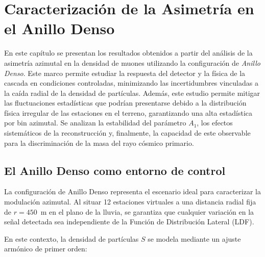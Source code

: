 %

\section{Caracterización de la Asimetría en el Anillo Denso}
\label{sec:cap_anillo_denso}

En este capítulo se presentan los resultados obtenidos a partir del análisis de la asimetría azimutal en la densidad de muones utilizando la configuración de \textit{Anillo Denso}. Este marco permite estudiar la respuesta del detector y la física de la cascada en condiciones controladas, minimizando las incertidumbres vinculadas a la caída radial de la densidad de partículas. Además, este estudio permite mitigar las fluctuaciones estadísticas que podrían presentarse debido a la distribución física irregular de las estaciones en el terreno, garantizando una alta estadística por bin azimutal. Se analizan la estabilidad del parámetro $A_1$, los efectos sistemáticos de la reconstrucción y, finalmente, la capacidad de este observable para la discriminación de la masa del rayo cósmico primario.

\subsection{El Anillo Denso como entorno de control}
\label{subsec:entorno_control}

La configuración de Anillo Denso representa el escenario ideal para caracterizar la modulación azimutal. Al situar 12 estaciones virtuales a una distancia radial fija de $r = 450$~m en el plano de la lluvia, se garantiza que cualquier variación en la señal detectada sea independiente de la Función de Distribución Lateral (LDF). 

En este contexto, la densidad de partículas $S$ se modela mediante un ajuste armónico de primer orden:

